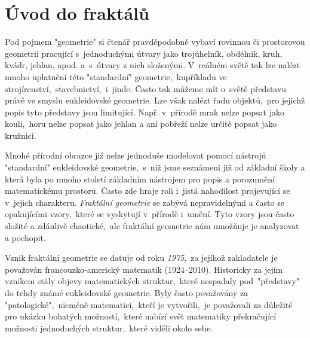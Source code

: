 \chapter{Úvod do fraktálů}\label{chapter:uvod_do_fraktalu}

Pod pojmem "geometrie" si čtenář pravděpodobně vybaví rovinnou či prostorovou geometrii pracující s~jednoduchými útvary jako trojúhelník, obdélník, kruh, kvádr, jehlan, apod. a~s~útvary z nich složenými. V~reálném světě tak lze nalézt mnoho uplatnění této "standardní" geometrie,~kupříkladu ve strojírenství,~stavebnictví,~i~jinde. Často tak můžeme mít o~světě představu právě ve smyslu eukleidovské geometrie. Lze však nalézt řadu objektů,~pro jejichž popis tyto představy jsou limitující. Např. v~přírodě mrak nelze popsat jako kouli,~horu nelze popsat jako jehlan a ani pobřeží nelze určitě popsat jako kružnici.\par

Mnohé přírodní obrazce již nelze jednoduše modelovat pomocí nástrojů "standardní" eukleidovské geometrie,~s~níž jsme seznámeni již od základní školy a která byla po mnoho století základním nástrojem pro popis a porozumění matematickému prostoru. Často zde hraje roli i~jistá nahodilost projevující se v~jejich charakteru. \emph{Fraktální geometrie} se zabývá nepravidelnými a často se opakujícími vzory,~které se vyskytují v~přírodě i~umění. Tyto vzory jsou často složité a zdánlivě chaotické,~ale fraktální geometrie nám umožňuje je analyzovat a pochopit.\par

Vznik fraktální geometrie se datuje od roku \emph{1975},~za jejíhož zakladatele je považován francouzko-americký matematik  \mbox{(1924--2010)}. Historicky za jejím vznikem stály objevy matematických struktur,~které nespadaly pod~"představy" do tehdy známé eukleidovské geometrie. Byly často považovány za "patologické",~nicméně matematici,~kteří je vytvořili,~je považovali za důležité pro ukázku bohatých možností,~které nabízí svět matematiky překračující možnosti jednoduchých struktur,~které viděli okolo sebe. \citep[str. 33]{Mandelbrot1983}




